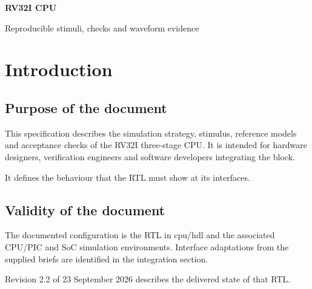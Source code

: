 \documentclass[11pt]{article}
\begin{document}
\begin{titlepage}\vspace*{24mm}
{\Huge\bfseries\color{accent}RV32I CPU\par}\vspace{4mm}{\LARGE Verification Specification\par}\vspace{12mm}
{\Large Reproducible stimuli, checks and waveform evidence\par}\vfill
{}\end{titlepage}
\tableofcontents
\clearpage
\section{Introduction}

\subsection{Purpose of the document}
\noindent This specification describes the simulation strategy, stimulus, reference models and acceptance checks of the RV32I three-stage CPU. It is intended for hardware designers, verification engineers and software developers integrating the block.\par\medskip
\noindent It defines the behaviour that the RTL must show at its interfaces.\par\medskip

\subsection{Validity of the document}
\noindent The documented configuration is the RTL in cpu/hdl and the associated CPU/PIC and SoC simulation environments. Interface adaptations from the supplied briefs are identified in the integration section.\par\medskip
\noindent Revision 2.2 of 23 September 2026 describes the delivered state of that RTL.\par\medskip

\end{document}
